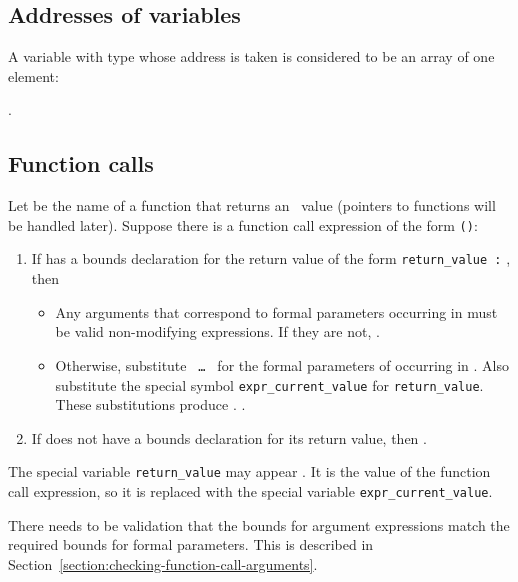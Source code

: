 \subsection{Addresses of variables}

A variable with type  whose address is taken is considered to be
an array of one element:

            {}.

\subsection{Function calls}

Let  be the name of a function that returns an
\arrayptr\ value (pointers to functions will be handled later).
Suppose there is a function call expression of the form
\texttt{(}\texttt{)}:

\begin{enumerate}
\item
  If  has a bounds declaration for the return value of the form
  \texttt{return\_value :} , then

  \begin{itemize}
  \item
    Any arguments that correspond to formal parameters occurring in
     must be valid non-modifying expressions. If they are
    not, .
  \item
    Otherwise, substitute \texttt{ \ldots{} } for the formal
    parameters of  occurring in . Also substitute the
    special symbol \texttt{expr\_current\_value} for
    \texttt{return\_value}. These substitutions produce .
    .
  \end{itemize}
\item
  If  does not have a bounds declaration for its return value,
  then .
\end{enumerate}

The special variable \texttt{return\_value} may appear . It
is the value of the function call expression, so it is replaced with the
special variable \texttt{expr\_current\_value}.

There needs to be validation that the bounds for argument expressions
match the required bounds for formal parameters. This is described in
Section~\ref{section:checking-function-call-arguments}.

